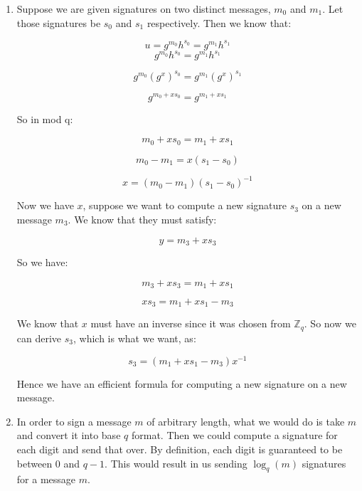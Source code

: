 \documentclass{article}
\begin{document}
\begin{enumerate}
\item %

Suppose we are given signatures on two distinct messages, $m_0$ and $m_1$. Let those signatures be $s_0$ and $s_1$ respectively. Then we know that:


$$u = g^{m_0} h^{s_0} = g^{m_1} h^{s_1}$$
$$g^{m_0} h^{s_0} = g^{m_1} h^{s_1}$$

$$g^{m_0} (g^x)^{s_0} = g^{m_1} (g^x)^{s_1}$$

$$g^{m_0 + x s_0} = g^{m_1 + x s_1}$$

So in mod q:

$$m_0 + x s_0 = m_1 + x s_1$$

$$m_0 - m_1 =  x(s_1 - s_0)$$

$$x =  (m_0 - m_1)(s_1 - s_0)^{-1}$$

Now we have $x$, suppose we want to compute a new signature $s_3$ on a new message $m_3$. We know that they must satisfy:

$$y =  m_3 + x s_3$$

So we have:

$$m_3 + x s_3 = m_1 + x s_1$$

$$x s_3 = m_1 + x s_1 - m_3$$

We know that $x$ must have an inverse since it was chosen from $ \mathbb{Z}_q$. So now we can derive $s_3$, which is what we want, as:

$$s_3 = (m_1 + x s_1 - m_3)x^{-1}$$

Hence we have an efficient formula for computing a new signature on a new message.

\item %
In order to sign a message $m$ of arbitrary length, what we would do is take $m$ and convert it into base $q$ format. Then we could compute a signature for each digit and send that over. By definition, each digit is guaranteed to be between 0 and $q - 1$. This would result in us sending $\log _q (m)$ signatures for a message $m$. 



\end{enumerate}
\end{document}
